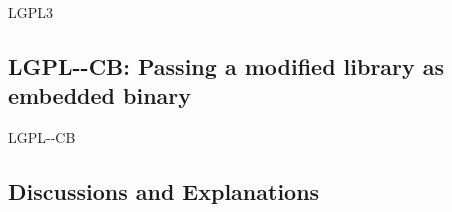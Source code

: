 \begin{license}{LGPL3}
\subsection{LGPL-\ver-CB: Passing a modified library as embedded binary}
\begin{lsuc}{LGPL-\ver-CB}

  \useCaseB

  \begin{lsucrequires}
    \lsucmandatory{\keepLicensingElements}
    \lsucmandatory{\lgplthreeEnsureCopyrightNoticeBinary}
    \lsucmandatory{\giveLicense}\passingFilesCorrectly
    \lsucmandatory{\makeEmbeddedSourceAvailable}
    \lsucmandatory{\describeHowToGetSource}
    \lsucmandatory{\addToCopyrightDialogLibWeak}
    \lsucmandatory{\markEmbeddedModifications}
    \lsucmandatory{\arrangeEmbeddedChanges}\howToApplyTheseTerms
    \lsucmandatory{\keepStructuralIndependence}
    \lsucmandatory{\allowRelinking}
    \lsucoptional{\createChangelog}  
    \lsucoptional{\addToDocumentation}
    \lsucoptional{\retainCopyrightNotices}
  \end{lsucrequires}

  \begin{lsucprohibits}
    \lsucitem{\noPatentLitigation}
  \end{lsucprohibits}
\end{lsuc}

\end{license}


\subsection{Discussions and Explanations}
\label{LGPL2Discussion}%
\label{LGPL3Discussion}
\newcommand{\lgplTwoAndGplThree}[2]{\footnote{%
    For LGPL-2.1 see \cite[cf.][\nopage wp.\ #1]{Lgpl21OsiLicense1999a}.
    \par\noindent
    For GPL-3.0, which is included in the LGPL-3.0, see \cite[cf.][\nopage
      wp.\ #2]{Gpl30OsiLicense2007a}.}} 

\newcommand{\lgplTwoAndThree}[2]{\footnote{%
    For LGPL-2.1 see \cite[cf.][\nopage wp.\ #1]{Lgpl21OsiLicense1999a}.
    \par\noindent
    For LGPL-3.0 see \cite[cf.][\nopage wp.\ #2]{Lgpl30OsiLicense2007a}.}}

